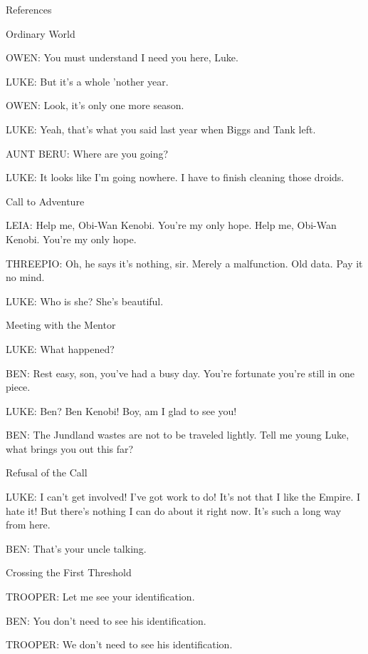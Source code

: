 \documentclass[a4paper,azure,pdf,colorBG,slideColor]{prosper}
\newcommand{\ns}[1]{\vfill \end{slide}\begin{slide}{#1}}
\newcommand{\bs}{\bigskip}
\newcommand{\ms}{\medskip}
\begin{document}
\begin{slide}{References}
\ns{Ordinary World}

OWEN: You must understand I need you here, Luke.
\bigskip

LUKE: But it's a whole 'nother year.
\bigskip

OWEN: Look, it's only one more season.
\bigskip


LUKE: Yeah, that's what you said last year when Biggs and Tank left.
\bigskip

AUNT BERU: Where are you going?
\bigskip

LUKE: It looks like I'm going nowhere. I have to finish cleaning those
droids.

\ns{Call to Adventure}

LEIA: Help me, Obi-Wan Kenobi. You're my only hope. Help me, Obi-Wan
Kenobi. You're my only hope.
\bigskip

THREEPIO: Oh, he says it's nothing, sir. Merely a malfunction. Old
data. Pay it no mind.
\bigskip


LUKE: Who is she? She's beautiful.



\ns{Meeting with the Mentor}


LUKE: What happened?

\bs

BEN: Rest easy, son, you've had a busy day. You're fortunate you're
still in one piece.

\bs

LUKE: Ben? Ben Kenobi! Boy, am I glad to see you! 

\bs

BEN: The Jundland wastes are not to be traveled lightly. Tell me young
Luke, what brings you out this far?


\ns{Refusal of the Call}

\bs

LUKE: I can't get involved! I've got work to do! It's not that I like
the Empire. I hate it! But there's nothing I can do about it right
now. It's such a long way from here.

\bs

BEN: That's your uncle talking.



\ns{Crossing the First Threshold}
{\small

TROOPER: Let me see your identification.

\ms

BEN: You don't need to see his identification.

\ms

TROOPER: We don't need to see his identification.

}
\end{slide}
\end{document}
